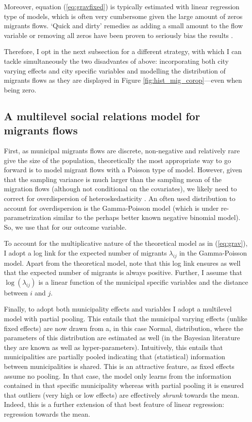 \documentclass[a4paper,fleqn]{cas-dc}
\begin{document}
Moreover, equation (\ref{eq:gravfixed}) is typically estimated with linear
regression type of models, which is often very cumbersome given the large amount
of zeros migrants flows. `Quick and dirty' remedies as adding a small amount to
the flow variable or removing all zeros have been proven to seriously bias the
results \citep{linders2006estimation, burger2009specification}.

Therefore, I opt in the next subsection for a different strategy, with which I
can tackle simultaneously the two disadvantes of above: incorporating both city
varying effects and city specific variables and modelling the distribution of
migrants flows as they are displayed in Figure \ref{fig:hist_mig_corop}---even when
being zero.

\subsection{A multilevel social relations model for migrants flows}

First, as municipal migrants flows are discrete, non-negative and relatively
rare give the size of the population, theoretically the most appropriate way to
go forward is to model migrant flows with a Poisson type of model. However,
given that the sampling variance is much larger than the sampling mean of the
migration flows (although not conditional on the covariates), we likely need to
correct for overdispersion of heteroskedasticity \citep[][states that
heteroskedasticity (rather than the presence of too many zeros) is responsible
for the main source of bias within gravity models.]{silva2006log}. An often used
distribution to account for overdispersion is the Gamma-Poisson model (which is
under re-parametrization similar to the perhaps better known negative binomial
model). So, we use that for our outcome variable.

To account for the multiplicative nature of the theoretical model as in
(\ref{eq:grav}), I adopt a log link for the expected number of migrants
$\lambda_{ij}$ in the Gamma-Poisson model. Apart from the theoretical model,
note that this log link ensures as well that the expected number of migrants is
always positive. Further, I assume that $\log(\lambda_{ij})$ is a linear
function of the municipal specific variables and the distance between $i$ and
$j$.

Finally, to adopt both municipality effects and variables I adopt a multilevel
model with partial pooling. This entails that the municipal varying effects
(unlike fixed effects) are now drawn from a, in this case Normal, distribution,
where the parameters of this distribution are estimated as well (in the Bayesian
literature they are known as well as hyper-parameters). Intuitively, this
entails that municipalities are partially pooled indicating that (statistical)
information between municipalities is shared. This is an attractive feature, as
fixed effects assume no pooling. In that case, the model only learns from the
information contained in that specific municipality whereas with partial pooling
it is ensured that outliers (very high or low effects) are effectively
\emph{shrunk} towards the mean. Indeed, this is a further extension of that best
feature of linear regression: regression towards the mean.
\end{document}
